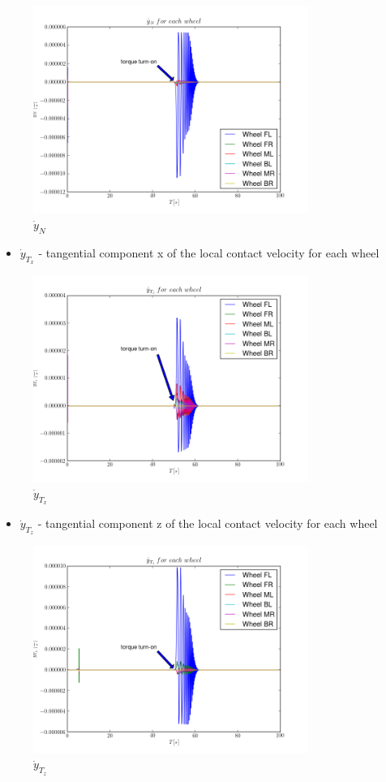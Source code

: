 \begin{figure}[H]
  \centering
    \includegraphics[width=0.8\textwidth]{yNdot2}
  \caption{$\dot{y}_{N}$}
\end{figure}

\begin{itemize}
  \item $\dot{y}_{T_x}$ - tangential component x of the local contact velocity for each wheel
\end{itemize}

\begin{figure}[H]
  \centering
    \includegraphics[width=0.8\textwidth]{yTxdots2}
  \caption{$\dot{y}_{T_x}$}
\end{figure}

\begin{itemize}
  \item $\dot{y}_{T_z}$ - tangential component z of the local contact velocity for each wheel
\end{itemize}

\begin{figure}[H]
  \centering
    \includegraphics[width=0.8\textwidth]{yTzdots2}
  \caption{$\dot{y}_{T_z}$}
\end{figure}
